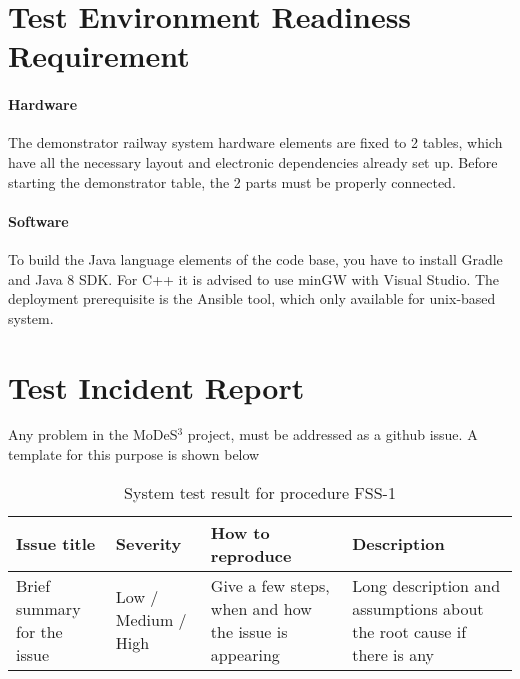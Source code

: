 \section{Test Environment Readiness Requirement}
\paragraph{Hardware} The demonstrator railway system hardware elements are fixed to 2 tables, which have all the necessary layout and electronic dependencies already set up. Before starting the demonstrator table, the 2 parts must be properly connected. 
\paragraph{Software} To build the Java language elements of the code base, you have to install Gradle and Java 8 SDK. For C++ it is advised to use minGW with Visual Studio. The deployment prerequisite is the Ansible tool, which only available for unix-based system.

\section{Test Incident Report} Any problem in the MoDeS$^3$ project, must be addressed as a github issue. A template for this purpose is shown below
\begin{table}[H]
	\caption{System test result for procedure FSS-1}
	\label{table:SystemTestProcedure-1-Result}
	\begin{center}
		\renewcommand{\arraystretch}{1.8}
		\begin{tabu} 
			to 0.9 \textwidth
			{ X[c] X[c] X[c] X[c] }
			\toprule
			Issue title                 & Severity            & How to reproduce                                      & Description                                                           \\ \midrule
			Brief summary for the issue & Low / Medium / High & Give a few steps, when and how the issue is appearing & Long description and assumptions about the root cause if there is any \\ \bottomrule
		\end{tabu}
	\end{center}
\end{table}
